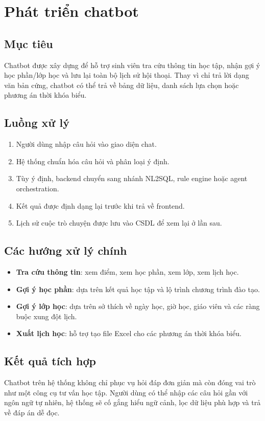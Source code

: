 \documentclass[12pt,a4paper]{report}
\begin{document}
\section{Phát triển chatbot}
\subsection{Mục tiêu}
Chatbot được xây dựng để hỗ trợ sinh viên tra cứu thông tin học tập, nhận gợi ý học phần/lớp học và lưu lại toàn bộ lịch sử hội thoại. Thay vì chỉ trả lời dạng văn bản cứng, chatbot có thể trả về bảng dữ liệu, danh sách lựa chọn hoặc phương án thời khóa biểu.

\subsection{Luồng xử lý}
\begin{enumerate}
    \item Người dùng nhập câu hỏi vào giao diện chat.
    \item Hệ thống chuẩn hóa câu hỏi và phân loại ý định.
    \item Tùy ý định, backend chuyển sang nhánh NL2SQL, rule engine hoặc agent orchestration.
    \item Kết quả được định dạng lại trước khi trả về frontend.
    \item Lịch sử cuộc trò chuyện được lưu vào CSDL để xem lại ở lần sau.
\end{enumerate}

\subsection{Các hướng xử lý chính}
\begin{itemize}
    \item \textbf{Tra cứu thông tin}: xem điểm, xem học phần, xem lớp, xem lịch học.
    \item \textbf{Gợi ý học phần}: dựa trên kết quả học tập và lộ trình chương trình đào tạo.
    \item \textbf{Gợi ý lớp học}: dựa trên sở thích về ngày học, giờ học, giáo viên và các ràng buộc xung đột lịch.
    \item \textbf{Xuất lịch học}: hỗ trợ tạo file Excel cho các phương án thời khóa biểu.
\end{itemize}

\subsection{Kết quả tích hợp}
Chatbot trên hệ thống không chỉ phục vụ hỏi đáp đơn giản mà còn đóng vai trò như một công cụ tư vấn học tập. Người dùng có thể nhập các câu hỏi gần với ngôn ngữ tự nhiên, hệ thống sẽ cố gắng hiểu ngữ cảnh, lọc dữ liệu phù hợp và trả về đáp án dễ đọc.
\end{document}
